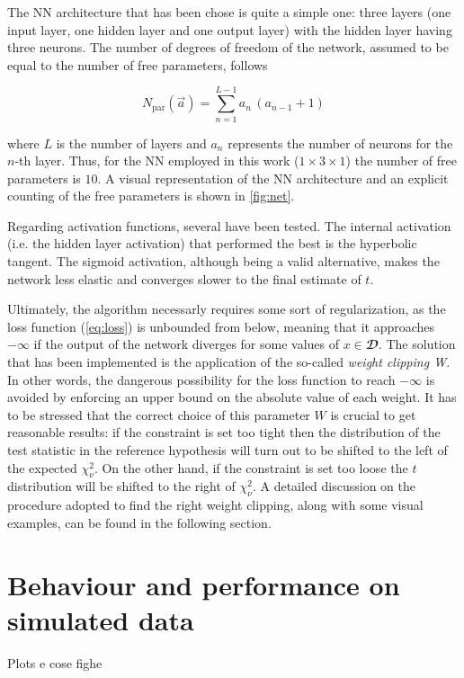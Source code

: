 The NN architecture that has been chose is quite a simple one: three layers (one input layer, one hidden layer and one
output layer) with the hidden layer having three neurons. The number of degrees of freedom of the network, assumed to be
equal to the number of free parameters, follows

\begin{equation}
    N_{\text{par}}(\vec{a})=\sum_{n=1}^{L-1} a_n \, (a_{n-1} + 1)
\end{equation}

\noindent where $L$ is the number of layers and $a_n$ represents the number of neurons for the $n$-th layer. Thus, for
the NN employed in this work ($1 \times 3 \times 1$) the number of free parameters is $10$. A visual representation of
the NN architecture and an explicit counting of the free parameters is shown in \autoref{fig:net}. 

Regarding activation functions, several have been tested. The internal activation (i.e. the hidden layer activation)
that performed the best is the hyperbolic tangent. The sigmoid activation, although being a valid alternative, makes the
network less elastic and converges slower to the final estimate of $t$. 

Ultimately, the algorithm necessarly requires some sort of regularization, as the loss function (\ref{eq:loss}) is
unbounded from below, meaning that it approaches $-\infty$ if the output of the network diverges for some values of
$x\in\mathbfcal{D}$. The solution that has been implemented is the application of the so-called \textit{weight clipping
W}. In other words, the dangerous possibility for the loss function to reach $-\infty$ is avoided by enforcing an upper
bound on the absolute value of each weight. It has to be stressed that the correct choice of this parameter $W$ is
crucial to get reasonable results: if the constraint is set too tight then the distribution of the test statistic in the
reference hypothesis will turn out to be shifted to the left of the expected $\chi^2_{\nu}$. On the other hand, if the
constraint is set too loose the $t$ distribution will be shifted to the right of $\chi^2_{\nu}$. A detailed discussion
on the procedure adopted to find the right weight clipping, along with some visual examples, can be found in the
following section. 


\section{Behaviour and performance on simulated data}
\label{sec:testdata}

Plots e cose fighe 